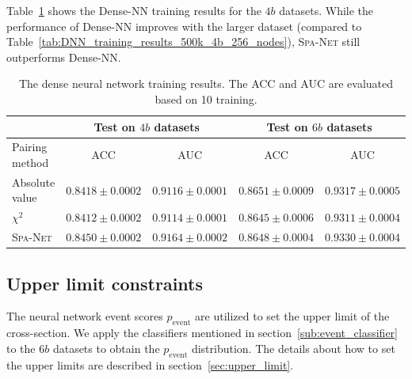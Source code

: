 \documentclass[12pt]{article}
\begin{document}
        Table~\ref{tab:DNN_training_results_1M_4b} shows the Dense-NN training results for the $4b$ datasets. While the performance of Dense-NN improves with the larger dataset (compared to Table~\ref{tab:DNN_training_results_500k_4b_256_nodes}), \textsc{Spa-Net} still outperforms Dense-NN.
        \begin{table}[htpb]
            \centering
            \caption{The dense neural network training results. The ACC and AUC are evaluated based on 10 training.}
            \label{tab:DNN_training_results_1M_4b}
            \begin{tabular}{l|cc|cc}
                             & \multicolumn{2}{c|}{Test on $4b$ datasets}& \multicolumn{2}{c}{Test on $6b$ datasets} \\ \hline
            Pairing method   & ACC                 & AUC                 & ACC                 & AUC                 \\ \hline
            Absolute value   & $0.8418 \pm 0.0002$ & $0.9116 \pm 0.0001$ & $0.8651 \pm 0.0009$ & $0.9317 \pm 0.0005$ \\
            $\chi^2$         & $0.8412 \pm 0.0002$ & $0.9114 \pm 0.0001$ & $0.8645 \pm 0.0006$ & $0.9311 \pm 0.0004$ \\
            \textsc{Spa-Net} & $0.8450 \pm 0.0002$ & $0.9164 \pm 0.0002$ & $0.8648 \pm 0.0004$ & $0.9330 \pm 0.0004$
            \end{tabular}
        \end{table}
    \subsection{Upper limit constraints}%
    \label{sub:upper_limit_constraints}
        The neural network event scores $p_{\text{event}}$ are utilized to set the upper limit of the cross-section. We apply the classifiers mentioned in section~\ref{sub:event_classifier} to the $6b$ datasets to obtain the $p_{\text{event}}$ distribution. The details about how to set the upper limits are described in section~\ref{sec:upper_limit}.
\end{document}
